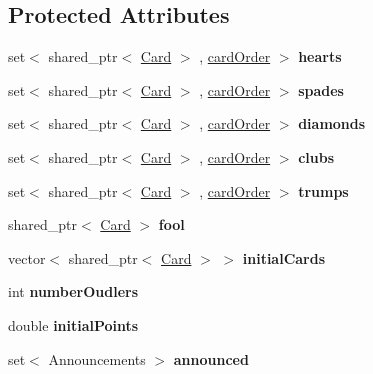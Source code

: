 \subsection*{\-Protected \-Attributes}
\begin{DoxyCompactItemize}
\item 
\hypertarget{classPlayer_afab8e372cfef87440bc42168d5fa0f6a}{set$<$ shared\-\_\-ptr$<$ \hyperlink{classCard}{\-Card} $>$\*
, \hyperlink{structPlayer_1_1cardOrder}{card\-Order} $>$ {\bfseries hearts}}\label{classPlayer_afab8e372cfef87440bc42168d5fa0f6a}

\item 
\hypertarget{classPlayer_a89177ee8076c1a3411a74b2b1d68156c}{set$<$ shared\-\_\-ptr$<$ \hyperlink{classCard}{\-Card} $>$\*
, \hyperlink{structPlayer_1_1cardOrder}{card\-Order} $>$ {\bfseries spades}}\label{classPlayer_a89177ee8076c1a3411a74b2b1d68156c}

\item 
\hypertarget{classPlayer_a3ad0f1545e0653635eac5ced5c31dc0b}{set$<$ shared\-\_\-ptr$<$ \hyperlink{classCard}{\-Card} $>$\*
, \hyperlink{structPlayer_1_1cardOrder}{card\-Order} $>$ {\bfseries diamonds}}\label{classPlayer_a3ad0f1545e0653635eac5ced5c31dc0b}

\item 
\hypertarget{classPlayer_ad3f3acdaf6ee318ba528e82e1c188820}{set$<$ shared\-\_\-ptr$<$ \hyperlink{classCard}{\-Card} $>$\*
, \hyperlink{structPlayer_1_1cardOrder}{card\-Order} $>$ {\bfseries clubs}}\label{classPlayer_ad3f3acdaf6ee318ba528e82e1c188820}

\item 
\hypertarget{classPlayer_a66b3455fc8c6685a78eb193a015a07a0}{set$<$ shared\-\_\-ptr$<$ \hyperlink{classCard}{\-Card} $>$\*
, \hyperlink{structPlayer_1_1cardOrder}{card\-Order} $>$ {\bfseries trumps}}\label{classPlayer_a66b3455fc8c6685a78eb193a015a07a0}

\item 
\hypertarget{classPlayer_a9dfead246bd18b99398c89777290a162}{shared\-\_\-ptr$<$ \hyperlink{classCard}{\-Card} $>$ {\bfseries fool}}\label{classPlayer_a9dfead246bd18b99398c89777290a162}

\item 
\hypertarget{classPlayer_aac0d154d58a07310ee23c3c763f2cfa9}{vector$<$ shared\-\_\-ptr$<$ \hyperlink{classCard}{\-Card} $>$ $>$ {\bfseries initial\-Cards}}\label{classPlayer_aac0d154d58a07310ee23c3c763f2cfa9}

\item 
\hypertarget{classPlayer_a9f218c1ff377eaeb7a336156410f7386}{int {\bfseries number\-Oudlers}}\label{classPlayer_a9f218c1ff377eaeb7a336156410f7386}

\item 
\hypertarget{classPlayer_af625acf7f8ad267630c7e3bd50d2683b}{double {\bfseries initial\-Points}}\label{classPlayer_af625acf7f8ad267630c7e3bd50d2683b}

\item 
\hypertarget{classPlayer_a90efe0cf8930297c7d30805d19763b65}{set$<$ \-Announcements $>$ {\bfseries announced}}\label{classPlayer_a90efe0cf8930297c7d30805d19763b65}

\end{DoxyCompactItemize}


